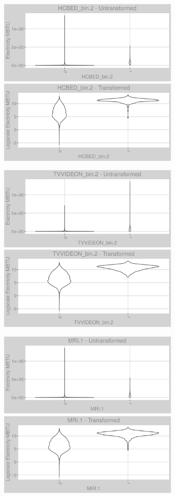 \FloatBarrier
\newpage
\begin{figure}
\centering
\begin{subfigure}{1\textwidth}
\centering
\includegraphics[width=.49\textwidth, height=0.3\textheight]{Images/electricity_var_original_3.png}
\includegraphics[width=.49\textwidth, height=0.3\textheight]{Images/electricity_var_transformed_3.png}
\end{subfigure}
\begin{subfigure}{1\textwidth}
\centering
\includegraphics[width=.49\textwidth, height=0.3\textheight]{Images/electricity_var_original_4.png}
\includegraphics[width=.49\textwidth, height=0.3\textheight]{Images/electricity_var_transformed_4.png}
\end{subfigure}
\begin{subfigure}{1\textwidth}
\centering
\includegraphics[width=.49\textwidth, height=0.3\textheight]{Images/electricity_var_original_5.png}
\includegraphics[width=.49\textwidth, height=0.3\textheight]{Images/electricity_var_transformed_5.png}
\end{subfigure}
\end{figure}

